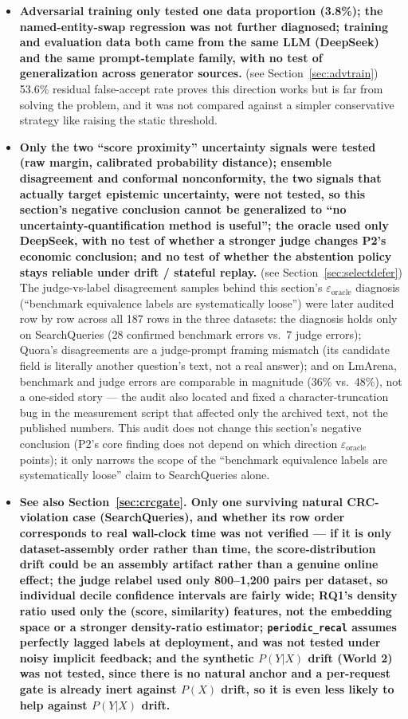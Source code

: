 \documentclass[11pt]{article}
\begin{document}
\begin{itemize}[leftmargin=*]
  \item \textbf{Adversarial training only tested one data proportion (3.8\%); the named-entity-swap regression was not further diagnosed; training and evaluation data both came from the same LLM (DeepSeek) and the same prompt-template family, with no test of generalization across generator sources.} (see Section~\ref{sec:advtrain}) 53.6\% residual false-accept rate proves this direction works but is far from solving the problem, and it was not compared against a simpler conservative strategy like raising the static threshold.
  \item \textbf{Only the two ``score proximity'' uncertainty signals were tested (raw margin, calibrated probability distance); ensemble disagreement and conformal nonconformity, the two signals that actually target epistemic uncertainty, were not tested, so this section's negative conclusion cannot be generalized to ``no uncertainty-quantification method is useful''; the oracle used only DeepSeek, with no test of whether a stronger judge changes P2's economic conclusion; and no test of whether the abstention policy stays reliable under drift / stateful replay.} (see Section~\ref{sec:selectdefer}) The judge-vs-label disagreement samples behind this section's $\varepsilon_\text{oracle}$ diagnosis (``benchmark equivalence labels are systematically loose'') were later audited row by row across all 187 rows in the three datasets: the diagnosis holds only on SearchQueries (28 confirmed benchmark errors vs.\ 7 judge errors); Quora's disagreements are a judge-prompt framing mismatch (its candidate field is literally another question's text, not a real answer); and on LmArena, benchmark and judge errors are comparable in magnitude (36\% vs.\ 48\%), not a one-sided story --- the audit also located and fixed a character-truncation bug in the measurement script that affected only the archived text, not the published numbers. This audit does not change this section's negative conclusion (P2's core finding does not depend on which direction $\varepsilon_\text{oracle}$ points); it only narrows the scope of the ``benchmark equivalence labels are systematically loose'' claim to SearchQueries alone.
  \item \textbf{See also Section~\ref{sec:crcgate}. Only one surviving natural CRC-violation case (SearchQueries), and whether its row order corresponds to real wall-clock time was not verified --- if it is only dataset-assembly order rather than time, the score-distribution drift could be an assembly artifact rather than a genuine online effect; the judge relabel used only 800--1{,}200 pairs per dataset, so individual decile confidence intervals are fairly wide; RQ1's density ratio used only the (score, similarity) features, not the embedding space or a stronger density-ratio estimator; \texttt{periodic\_\allowbreak{}recal} assumes perfectly lagged labels at deployment, and was not tested under noisy implicit feedback; and the synthetic $P(Y|X)$ drift (World 2) was not tested, since there is no natural anchor and a per-request gate is already inert against $P(X)$ drift, so it is even less likely to help against $P(Y|X)$ drift.}

\end{itemize}
\end{document}
